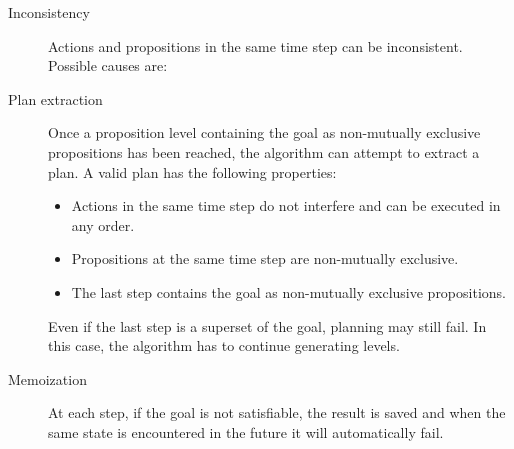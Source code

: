 \begin{description}
    \item[Inconsistency] 
        Actions and propositions in the same time step can be inconsistent.
        Possible causes are:

    \item[Plan extraction] 
        Once a proposition level containing the goal as non-mutually exclusive propositions has been reached,
        the algorithm can attempt to extract a plan.
        A valid plan has the following properties:
        \begin{itemize}
            \item Actions in the same time step do not interfere and can be executed in any order.
            \item Propositions at the same time step are non-mutually exclusive.
            \item The last step contains the goal as non-mutually exclusive propositions.
        \end{itemize}
        Even if the last step is a superset of the goal, planning may still fail.
        In this case, the algorithm has to continue generating levels.

    \item[Memoization] 
        At each step, if the goal is not satisfiable, the result is saved and 
        when the same state is encountered in the future it will automatically fail.
\end{description}


